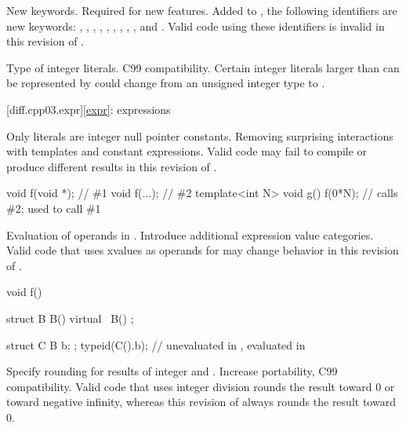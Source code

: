 \change
New keywords.
\rationale
Required for new features.
\effect
Added to , the following identifiers are new keywords:
,
,
,
,
,
,
,
,
,
and
.
Valid \CppIII{} code using these identifiers is invalid in this revision of \Cpp{}.

\change
Type of integer literals.
\rationale
C99 compatibility.
\effect
Certain integer literals larger than can be represented by  could
change from an unsigned integer type to .

[diff.cpp03.expr]{\ref{expr}: expressions}

\change
Only literals are integer null pointer constants.
\rationale
Removing surprising interactions with templates and constant
expressions.
\effect
Valid \CppIII{} code may fail to compile or produce different results in
this revision of \Cpp{}.
\begin{example}
\begin{codeblock}
void f(void *);     // \#1
void f(...);        // \#2
template<int N> void g() {
  f(0*N);           // calls \#2; used to call \#1
}
\end{codeblock}
\end{example}

\change
Evaluation of operands in .
\rationale
Introduce additional expression value categories.
\effect
Valid \CppIII{} code that uses xvalues as operands for 
may change behavior in this revision of \Cpp{}.
\begin{example}
\begin{codeblock}
void f() {
  struct B {
    B() {}
    virtual ~B() { }
  };

  struct C { B b; };
  typeid(C().b);    // unevaluated in \CppIII{}, evaluated in \CppXI{}
}
\end{codeblock}
\end{example}

\change
Specify rounding for results of integer \tcode{/} and \tcode{\%}.
\rationale
Increase portability, C99 compatibility.
\effect
Valid \CppIII{} code that uses integer division rounds the result toward 0 or
toward negative infinity, whereas this revision of \Cpp{} always rounds
the result toward 0.

